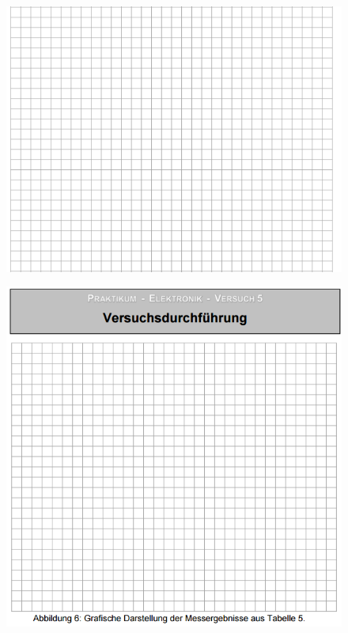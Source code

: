 \begin{figure}[!ht]
\begin{center}
\includegraphics[scale=0.8]{Text}
\end{center}
\end{figure}
\begin{figure}[!ht]
\begin{center}
\includegraphics[scale=0.8]{Graph3}
\end{center}
\end{figure}
